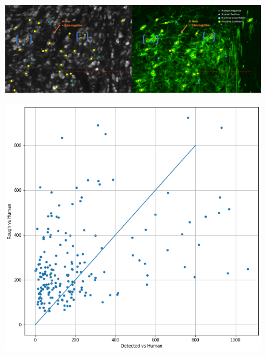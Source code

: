 \documentclass[runningheads]{llncs}
\begin{document}
\begin{figure}[t]
  \includegraphics[width=\textwidth]{figures/Marked_cell_detections.png}
  \caption{}
\end{figure}

\begin{figure}[t]
  \includegraphics[width=\textwidth]{figures/RoughVSDEtection.png}
  \caption{}
\end{figure}
\end{document}
